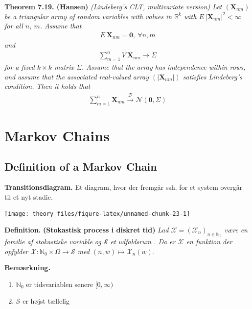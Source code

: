 \documentclass[a4paper,12pt,openany]{book}
\providecommand{\tightlist}{%
 \setlength{\itemsep}{0pt}\setlength{\parskip}{0pt}}
\begin{document}
\textbf{Theorem 7.19. (Hansen)} \emph{(Lindeberg's CLT, multivariate version) Let \((\mathbf{X}_{nm})\) be a triangular array of random variables with values in \(\mathbb{R}^k\) with \(E\ \vert \mathbf{X}_{nm}\vert^2<\infty\) for all \(n\), \(m\). Assume that}
\begin{align*}
    E\ \mathbf{X}_{nm}=\mathbf{0},\ \forall n,m
\end{align*}
\emph{and}
\begin{align*}
    \sum_{m=1}^n V\ \mathbf{X}_{nm}\to \Sigma
\end{align*}
\emph{for a fixed \(k\times k\) matrix \(\Sigma\). Assume that the array has independence within rows, and assume that the associated real-valued array \((\vert\mathbf{X}_{nm}\vert )\) satisfies Lindeberg's condition. Then it holds that}
\begin{align*}
    \sum_{m=1}^n\mathbf{X}_{nm}\stackrel{\mathcal{D}}{\to} \mathcal{N}(\mathbf{0},\Sigma)
\end{align*}

\hypertarget{markov-chains}{%
\chapter{Markov Chains}\label{markov-chains}}

\hypertarget{definition-of-a-markov-chain}{%
\section{Definition of a Markov Chain}\label{definition-of-a-markov-chain}}

\textbf{Transitionsdiagram.} Et diagram, hvor der fremgår ssh. for et system overgår til et nyt stadie.

\begin{center}\texttt{[image: theory\_files/figure-latex/unnamed-chunk-23-1]} \end{center}

\textbf{Definition.} \textbf{(Stokastisk process i diskret tid)} \emph{Lad \(\mathcal{X}=(\mathcal{X}_n)_{n\in\mathbb{N}_0}\) være en familie af stokastiske variable og \(\mathcal{S}\) et udfaldsrum . Da er \(\mathcal{X}\) en funktion der opfylder \(\mathcal{X} : \mathbb{N}_0\times \Omega \to \mathcal{S}\) med \((n,w) \mapsto \mathcal{X}_n(w)\).}

\textbf{Bemærkning.}

\begin{enumerate}
\def\labelenumi{\roman{enumi}.}
\tightlist
\item
  \(\mathbb{N}_0\) er tidsvariablen senere \([0,\infty)\)
\item
  \(\mathcal{S}\) er højst tællelig
\end{enumerate}
\end{document}
